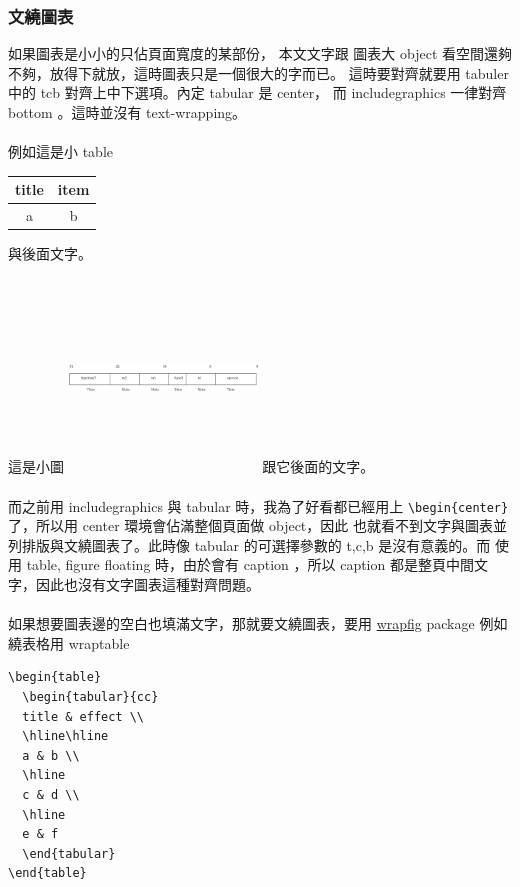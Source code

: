 \subsubsection{文繞圖表}
如果圖表是小小的只佔頁面寬度的某部份， 本文文字跟
圖表大 object 看空間還夠不夠，放得下就放，這時圖表只是一個很大的字而已。
這時要對齊就要用 tabuler 中的 tcb 對齊上中下選項。內定 tabular 是 center，
 而 includegraphics 一律對齊 bottom 。這時並沒有 text-wrapping。
\\\\
例如這是小 table 
\begin{tabular}{cc}
title & item \\
\hline\hline
a & b
\end{tabular}
與後面文字。
\\\\
這是小圖 \includegraphics[width=5cm,height=5cm]{images/riscv.eps} 跟它後面的文字。
\\\\
而之前用 includegraphics 與 tabular 時，我為了好看都已經用上
 \verb=\begin{center}=了，所以用 center 環境會佔滿整個頁面做 object，因此
也就看不到文字與圖表並列排版與文繞圖表了。此時像 tabular 的可選擇參數的
 t,c,b 是沒有意義的。而 使用 table, figure floating 時，由於會有
 caption ，所以 caption 都是整頁中間文字，因此也沒有文字圖表這種對齊問題。
\\\\
如果想要圖表邊的空白也填滿文字，那就要文繞圖表，要用 
\href{https://mirror.math.princeton.edu/pub/CTAN/macros/latex/contrib/wrapfig/wrapfig-doc.pdf}{wrapfig} package
例如繞表格用 wraptable
\begin{verbatim}
\begin{table}
  \begin{tabular}{cc}
  title & effect \\
  \hline\hline
  a & b \\
  \hline
  c & d \\
  \hline
  e & f 
  \end{tabular}
\end{table}
\end{verbatim}

